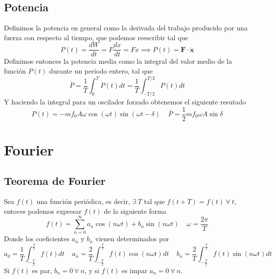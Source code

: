 \subsection{Potencia}
Definimos la potencia en general como la derivada del trabajo \newline producido por una fuerza con respecto al tiempo, que podemos \newline reescribir tal que
\begin{equation} \label{6.1.1}
    P(t) = \frac{dW}{dt} = F \frac{dx}{dt} = F \dot{x} \implies P(t) = \mathbf{F} \cdot \dot{\mathbf{x}}
\end{equation}
Definimos entonces la potencia media como la integral del valor medio de la función $P(t)$ durante un periodo entero, tal que 
\begin{equation} \label{6.1.1}
    \bar{P} = \frac{1}{T} \int_0^T P(t)dt = \frac{1}{T} \int_{-T/2}^{T/2} P(t)dt
\end{equation}
Y haciendo la integral para un oscilador forzado obtenemos el siguiente resutado
\begin{equation} \label{6.1.1}
    P(t)= -m f_0 A \omega \cos(\omega t) \sin(\omega t -\delta) \ \ \ \ \ \bar{P} = \frac{1}{2} m f_0 \omega A \sin\delta 
\end{equation}
\vspace{-30pt}
\section{Fourier}
\subsection{Teorema de Fourier}
Sea $f(t)$ una función periódica, es decir, $\exists \ T$ tal que $f(t+T) = f(t) \ \forall \ t$, entoces podemos expresar $f(t)$ de la siguiente forma
\begin{equation} \label{6.1.1}
    f(t) = \sum_{n=0}^\infty a_n \cos (n\omega t) + b_n \sin (n\omega t) \ \ \ \ \ \omega = \frac{2\pi}{T}
\end{equation}
Donde los coeficientes $a_n$ y $b_n$ vienen determinados por 
\begin{equation} \label{6.1.1}
    a_0 = \frac{1}{T}\int_{-\frac{T}{2}}^{\frac{T}{2}} f(t)dt \ \ \ \ \ a_n = \frac{2}{T}\int_{-\frac{T}{2}}^{\frac{T}{2}} f(t)\cos(n\omega t)dt \ \ \ \ \ b_n = \frac{2}{T}\int_{-\frac{T}{2}}^{\frac{T}{2}} f(t)\sin(n\omega t)dt
\end{equation}
Si $f(t)$ es par, $b_n =0 \ \forall \ n$, y si $f(t)$ es impar $a_n =0 \ \forall \ n$.
